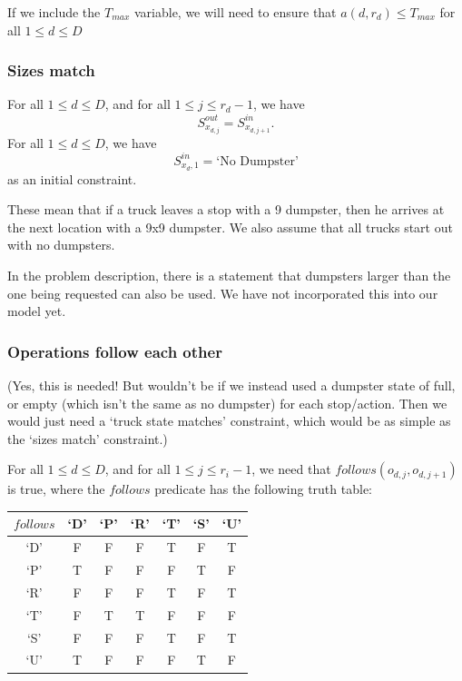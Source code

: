 \documentclass{article}
\begin{document}
If we include the $T_{max}$ variable, we will need to ensure that $a(d,r_d) \le T_{max}$ for all $1 \le d \le D$

\subsubsection {Sizes match}

For all $1 \le d \le D$, and for all $1 \le j \le r_d - 1$, we have
$$S^{out}_{x_{d,j}} = S^{in}_{x_{d,j+1}}.$$
For all $1 \le d \le D$, we have
$$S^{in}_{x_d,1} = \mbox{`No Dumpster'} $$
as an initial constraint.

These mean that if a truck leaves a stop with a 9 dumpster, then he arrives at the next location with a 9x9 dumpster.
We also assume that all trucks start out with no dumpsters.

In the problem description, there is a statement that dumpsters larger than the one being requested can also be used.
We have not incorporated this into our model yet.

\subsubsection {Operations follow each other}
(Yes, this is needed! But wouldn't be if we instead used a dumpster state of full, or empty (which isn't the same as no dumpster) for each stop/action.
Then we would just need a `truck state matches' constraint, which would be as simple as the `sizes match' constraint.)

For all $1 \le d \le D$, and for all $1 \le j \le r_i - 1$, we need that $follows(o_{d, j}, o_{d, j+1})$ is true, where the $follows$ predicate has the following truth table:

\begin{tabular}{ c | c c c c c c }
 $follows$    & `D' & `P' & `R' & `T' & `S' & `U' \\
 \hline
 `D'          & F   & F   & F   & T   & F   & T   \\
 `P'          & T   & F   & F   & F   & T   & F   \\
 `R'          & F   & F   & F   & T   & F   & T   \\
 `T'          & F   & T   & T   & F   & F   & F   \\
 `S'          & F   & F   & F   & T   & F   & T   \\
 `U'          & T   & F   & F   & F   & T   & F   \\
\end{tabular}
\end{document}
